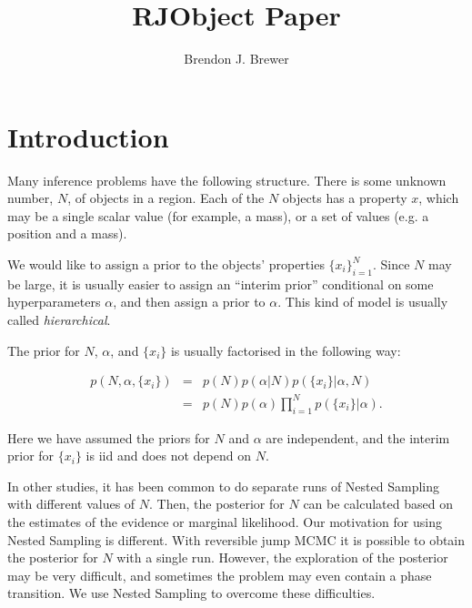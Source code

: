 \documentclass[letterpaper, 11pt]{article}
\title{RJObject Paper}
\author{Brendon J. Brewer}
\begin{document}
\maketitle
{}

\section{Introduction}
Many inference problems have the following structure. There is some unknown
number, $N$, of objects in a region. Each of the $N$ objects has a property
$x$, which may be a single scalar value (for example, a mass), or a set of
values (e.g. a position and a mass).

We would like to assign a prior to the objects' properties $\{x_i\}_{i=1}^N$.
Since $N$ may be large, it is usually easier to assign an ``interim prior''
conditional on some hyperparameters $\alpha$, and then assign a prior to
$\alpha$. This kind of model is usually called {\it hierarchical}.

The prior for $N$, $\alpha$, and $\{x_i\}$ is usually factorised
in the following way:

\begin{eqnarray}
p(N, \alpha, \{x_i\}) &=& p(N) p(\alpha | N) p(\{x_i\} | \alpha, N) \\
&=& p(N) p(\alpha) \prod_{i=1}^N p(\{x_i\} | \alpha).
\end{eqnarray}

Here we have assumed the priors for $N$ and $\alpha$ are independent, and
the interim prior for $\{x_i\}$ is iid and does not depend on $N$.


In other studies, it has been common to do separate runs of Nested Sampling
with different values of $N$. Then, the posterior for $N$ can be calculated
based on the estimates of the evidence or marginal likelihood. Our motivation
for using Nested Sampling is different. With reversible jump MCMC it is possible
to obtain the posterior for $N$ with a single run. However, the exploration
of the posterior may be very difficult, and sometimes the problem may even
contain a phase transition. We use Nested Sampling to overcome these
difficulties.

\end{document}

